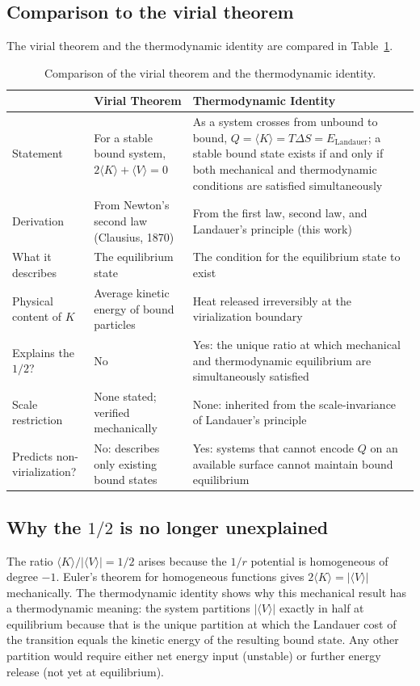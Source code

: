 \documentclass[12pt,a4paper]{article}
\begin{document}
\subsection{Comparison to the virial theorem}

The virial theorem and the thermodynamic identity are compared in
Table~\ref{tab:comparison}.

\begin{table}[H]
\centering
\caption{Comparison of the virial theorem and the thermodynamic identity.}
\label{tab:comparison}
\begin{tabular}{p{3.5cm} p{5.5cm} p{5.5cm}}
\toprule
& \textbf{Virial Theorem} & \textbf{Thermodynamic Identity} \\
\midrule
Statement
& For a stable bound system, $2\langle K\rangle + \langle V\rangle = 0$
& As a system crosses from unbound to bound, $Q = \langle K\rangle =
  T\Delta S = E_\mathrm{Landauer}$; a stable bound state exists
  if and only if both mechanical and thermodynamic conditions are
  satisfied simultaneously \\[6pt]
Derivation
& From Newton's second law (Clausius, 1870)
& From the first law, second law, and Landauer's principle (this work) \\[6pt]
What it describes
& The equilibrium state
& The condition for the equilibrium state to exist \\[6pt]
Physical content of $K$
& Average kinetic energy of bound particles
& Heat released irreversibly at the virialization boundary \\[6pt]
Explains the $1/2$?
& No
& Yes: the unique ratio at which mechanical and thermodynamic
  equilibrium are simultaneously satisfied \\[6pt]
Scale restriction
& None stated; verified mechanically
& None: inherited from the scale-invariance of Landauer's principle \\[6pt]
Predicts non-virialization?
& No: describes only existing bound states
& Yes: systems that cannot encode $Q$ on an available surface
  cannot maintain bound equilibrium \\
\bottomrule
\end{tabular}
\end{table}

\subsection{Why the $1/2$ is no longer unexplained}

The ratio $\langle K \rangle / |\langle V \rangle| = 1/2$ arises because
the $1/r$ potential is homogeneous of degree $-1$. Euler's theorem for
homogeneous functions gives $2\langle K \rangle = |\langle V \rangle|$
mechanically. The thermodynamic identity shows why this mechanical result
has a thermodynamic meaning: the system partitions $|\langle V \rangle|$
exactly in half at equilibrium because that is the unique partition at
which the Landauer cost of the transition equals the kinetic energy of the
resulting bound state. Any other partition would require either net energy
input (unstable) or further energy release (not yet at equilibrium).
\end{document}
